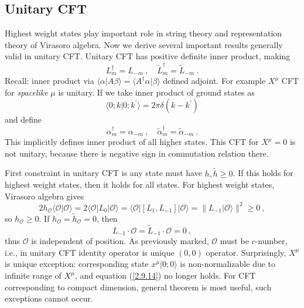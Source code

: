 \subsection*{Unitary CFT}

Highest weight states play important role in string theory and representation theory of Virasoro algebra. Now we derive several important results generally valid in unitary CFT.    
Unitary CFT has positive definite inner product, making    
\begin{equation}
	L_{m}^{\dagger}=L_{-m} \: , \quad \tilde{L}_{m}^{\dagger}=\tilde{L}_{-m} \:. \label{2.9.11}
\end{equation}
Recall: inner product via $\langle\alpha \vert A \beta\rangle=\langle A^{\dagger} \alpha \vert \beta\rangle$ defined adjoint.    
For example $X^\mu$ CFT for \emph{spacelike} $\mu$ is unitary. If we take inner product of ground states as    
\begin{equation}
	\langle 0 ; k \vert 0 ;
	k^{\prime} \rangle=2 \pi \delta(k-k^{\prime})  \label{2.9.12}
\end{equation} 
and define    
\begin{equation}
	\alpha_{m}^{\dagger}=\alpha_{-m} \:, \quad \tilde{\alpha}_{m}^{\dagger}=\tilde{\alpha}_{-m} \:. \label{2.9.13}
\end{equation}
This implicitly defines inner product of all higher states. This CFT for $X^\mu=0$ is not unitary, because there is negative sign in commutation relation there.    

First constraint in unitary CFT is any state must have $h, \tilde{h} \geq 0$.    
If this holds for highest weight states, then it holds for all states. For highest weight states, Virasoro algebra gives    
\begin{equation}\label{2.9.14}
	2 h_{\mathcal{O}}\langle\mathcal{O} \vert \mathcal{O}\rangle=2\langle\mathcal{O}\vert L_{0}\vert \mathcal{O}\rangle=\langle\mathcal{O}|[L_{1}, L_{-1}]|\mathcal{O}\rangle=\| L_{-1}|\mathcal{O}\rangle \|^{2} \geq 0 \:,
\end{equation}
so $h_{\mathcal{O}} \geq 0 $.    
If $h_{\mathcal{O}}=\tilde{h}_{\mathcal{O}}=0$, then    
\begin{equation}
	L_{-1} \cdot \mathcal{O}=\tilde{L}_{-1} \cdot \mathcal{O}=0 \:, \label{2.9.15}
\end{equation}
thus $\mathcal{O}$ is independent of position. As previously marked, $\mathcal{O}$ must be $c$-number, i.e., in unitary CFT identity operator is unique $(0,0)$ operator. Surprisingly, $X^\mu$ is unique exception: corresponding state $x^{\mu}|0 ;
0\rangle$ is non-normalizable due to infinite range of $X^\mu$, and equation (\ref{2.9.14}) no longer holds.    
For CFT corresponding to compact dimension, general theorem is most useful, such exceptions cannot occur.    

